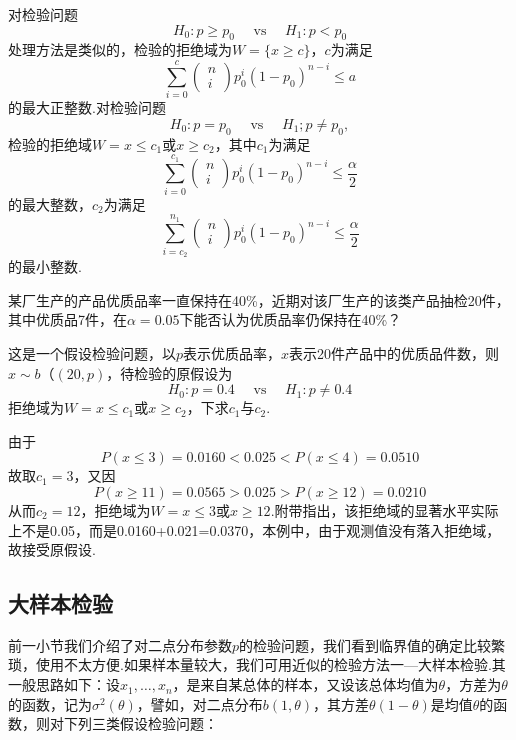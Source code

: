 对检验问题
\begin{equation}\label{eq7.3.10}
H _ { 0 } : p \geq p _ { 0 } \quad \text { vs } \quad H _ { 1 } : p < p _ { 0 }
\end{equation}
处理方法是类似的，检验的拒绝域为$W=\{x\geq c\}$，$c$为满足
\[\sum _ { i = 0 } ^ { c } \left( \begin{array} { l } { n } \\ { i } \end{array} \right) p _ { 0 } ^ { i } \left( 1 - p _ { 0 } \right) ^ { n - i } \leq a\]
的最大正整数.对检验问题
\begin{equation}\label{eq7.3.11}
H _ { 0 } : p = p _ { 0 } \quad \text { vs } \quad H _ { 1 } ; p \neq p _ { 0 },
\end{equation}
检验的拒绝域$W={x\leq c_{1}\text{或}x\geq c_{2}}$，其中$c_{1}$为满足
\[\sum _ { i = 0 } ^ { c _ { 1 } } \left( \begin{array} { l } { n } \\ { i } \end{array} \right) p _ { 0 } ^ { i } \left( 1 - p _ { 0 } \right) ^ { n - i } \leq \frac { \alpha } { 2 }\]
的最大整数，$c_{2}$为满足
\[\sum _ { i = c _ { 2 } } ^ { n _ { 1 } } \left( \begin{array} { l } { n } \\ { i } \end{array} \right) p _ { 0 } ^ { i } \left( 1 - p _ { 0 } \right) ^ { n - i } \leq \frac { \alpha } { 2 }\]
的最小整数.
\begin{example}\label{exam7.3.2}
	某厂生产的产品优质品率一直保持在40\%，近期对该厂生产的该类产品抽检20件，其中优质品7件，在$\alpha=0.05$下能否认为优质品率仍保持在40\%？
	
	这是一个假设检验问题，以$p$表示优质品率，$x$表示20件产品中的优质品件数，则$x\sim b（(20,p)$，待检验的原假设为
	\[H _ { 0 } : p = 0.4 \quad \text { vs } \quad H _ { 1 } : p \neq 0.4\]
	拒绝域为$W={x\leq c_{1}\text{或}x\geq c_{2}}$，下求$c_{1}$与$c_{2}$.
		
	由于
	\[P ( x \leq 3 ) = 0.0160 < 0.025 < P ( x \leq 4 ) = 0.0510\]
	故取$c_{1}=3$，又因
	\[P ( x \geq 11 ) = 0.0565 > 0.025 > P ( x \geq 12 ) = 0.0210\]
	从而$c_{2}=12$，拒绝域为$W={x\leq 3\text{或}x\geq 12}$.附带指出，该拒绝域的显著水平实际上不是0.05，而是0.0160+0.021=0.0370，本例中，由于观测值没有落入拒绝域，故接受原假设.
\end{example}

\subsection{大样本检验}\label{sec:7.3.3}
前一小节我们介绍了对二点分布参数$p$的检验问题，我们看到临界值的确定比较繁琐，使用不太方便.如果样本量较大，我们可用近似的检验方法一—大样本检验.其一般思路如下：设$x_{1},\dotsc,x_{n}$，是来自某总体的样本，又设该总体均值为$\theta$，方差为$\theta$的函数，记为$\sigma^{2}(\theta)$，譬如，对二点分布$b(1,\theta)$，其方差$\theta(1-\theta)$是均值$\theta$的函数，则对下列三类假设检验问题：

